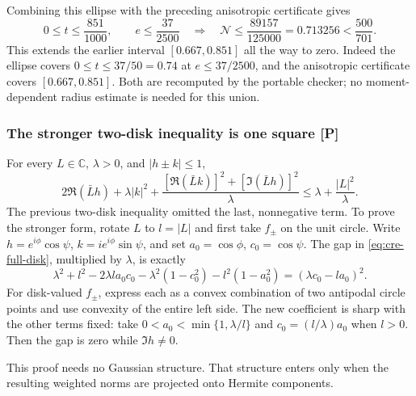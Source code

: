Combining this ellipse with the preceding anisotropic certificate gives
\begin{equation}\label{eq:cre-union}
 \boxed{\quad 0\le t\le\frac{851}{1000},\qquad e\le\frac{37}{2500}
 \quad\Longrightarrow\quad
 \mathcal N\le\frac{89157}{125000}=0.713256<\frac{500}{701}.\quad}
\end{equation}
This extends the earlier interval $[0.667,0.851]$ all the way to zero.
Indeed the ellipse covers $0\le t\le37/50=0.74$ at $e\le37/2500$,
and the anisotropic certificate covers $[0.667,0.851]$. Both are
recomputed by the portable checker; no moment-dependent radius estimate
is needed for this union.

\subsubsection{The stronger two-disk inequality is one square [P]}
For every $L\in\mathbb C$, $\lambda>0$, and $|h\pm k|\le1$,
\begin{equation}\label{eq:cre-full-disk}
 \boxed{\quad
 2\Re(\bar Lh)+\lambda|k|^2+
 \frac{[\Re(\bar Lk)]^2+[\Im(\bar Lh)]^2}{\lambda}
 \le \lambda+\frac{|L|^2}{\lambda}.
 \quad}
\end{equation}
The previous two-disk inequality omitted the last, nonnegative term.
To prove the stronger form, rotate $L$ to $l=|L|$ and first take
$f_\pm$ on the unit circle. Write
$h=e^{i\phi}\cos\psi$, $k=ie^{i\phi}\sin\psi$, and set
$a_0=\cos\phi$, $c_0=\cos\psi$. The gap in
\eqref{eq:cre-full-disk}, multiplied by $\lambda$, is exactly
\[
 \lambda^2+l^2-2\lambda l a_0c_0-
 \lambda^2(1-c_0^2)-l^2(1-a_0^2)
       =(\lambda c_0-la_0)^2.
\]
For disk-valued $f_\pm$, express each as a convex combination of two
antipodal circle points and use convexity of the entire left side.
The new coefficient is sharp with the other terms fixed: take
$0<a_0<\min\{1,\lambda/l\}$ and $c_0=(l/\lambda)a_0$ when $l>0$.
Then the gap is zero while $\Im h\ne0$.

This proof needs no Gaussian structure. That structure enters only when
the resulting weighted norms are projected onto Hermite components.

